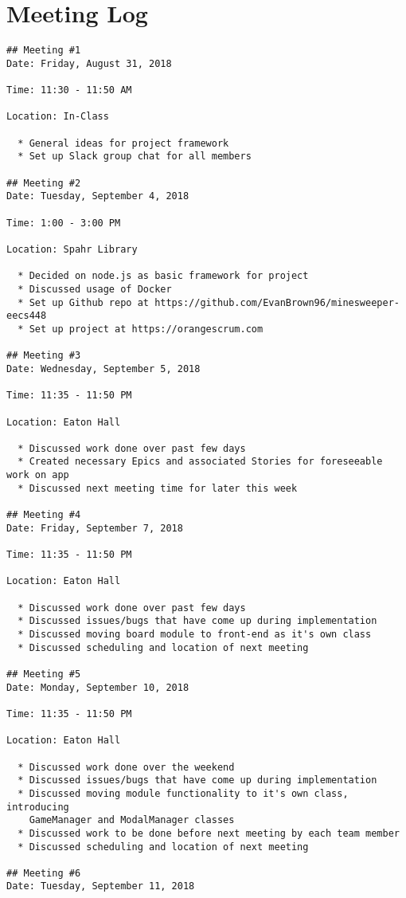 \documentclass[12pt]{report}
\begin{document}
\section*{Meeting Log}
\begin{lstlisting}
## Meeting #1
Date: Friday, August 31, 2018

Time: 11:30 - 11:50 AM

Location: In-Class

  * General ideas for project framework
  * Set up Slack group chat for all members

## Meeting #2
Date: Tuesday, September 4, 2018

Time: 1:00 - 3:00 PM

Location: Spahr Library

  * Decided on node.js as basic framework for project
  * Discussed usage of Docker
  * Set up Github repo at https://github.com/EvanBrown96/minesweeper-eecs448
  * Set up project at https://orangescrum.com

## Meeting #3
Date: Wednesday, September 5, 2018

Time: 11:35 - 11:50 PM

Location: Eaton Hall

  * Discussed work done over past few days
  * Created necessary Epics and associated Stories for foreseeable work on app
  * Discussed next meeting time for later this week

## Meeting #4
Date: Friday, September 7, 2018

Time: 11:35 - 11:50 PM

Location: Eaton Hall

  * Discussed work done over past few days
  * Discussed issues/bugs that have come up during implementation
  * Discussed moving board module to front-end as it's own class
  * Discussed scheduling and location of next meeting

## Meeting #5
Date: Monday, September 10, 2018

Time: 11:35 - 11:50 PM

Location: Eaton Hall

  * Discussed work done over the weekend
  * Discussed issues/bugs that have come up during implementation
  * Discussed moving module functionality to it's own class, introducing
    GameManager and ModalManager classes
  * Discussed work to be done before next meeting by each team member
  * Discussed scheduling and location of next meeting

## Meeting #6
Date: Tuesday, September 11, 2018


\end{lstlisting}
\end{document}
